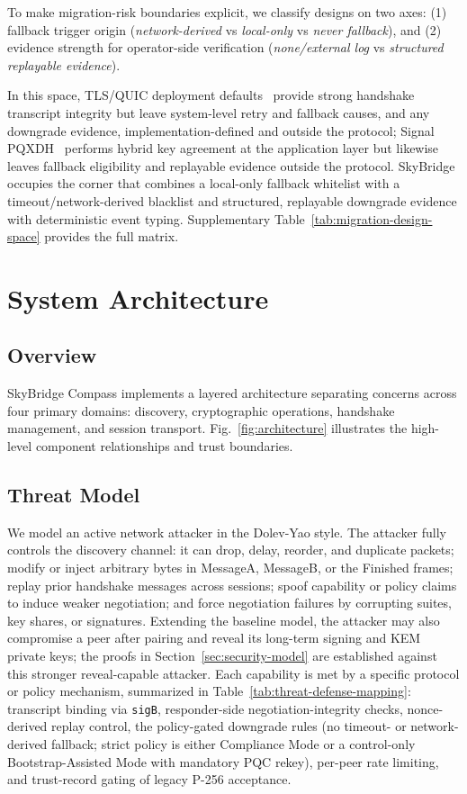 \documentclass[10pt,journal,compsoc]{IEEEtran}
\begin{document}
To make migration-risk boundaries explicit, we classify designs on two
axes: (1) fallback trigger origin (\emph{network-derived} vs
\emph{local-only} vs \emph{never fallback}), and (2) evidence strength
for operator-side verification (\emph{none/external log} vs
\emph{structured replayable evidence}).

In this space, TLS/QUIC deployment defaults~\cite{ref6,ref18} provide
strong handshake transcript integrity but leave system-level retry and
fallback causes, and any downgrade evidence, implementation-defined and
outside the protocol; Signal PQXDH~\cite{ref9} performs hybrid key
agreement at the application layer but likewise leaves fallback
eligibility and replayable evidence outside the protocol. SkyBridge
occupies the corner that combines a local-only fallback whitelist with a
timeout/network-derived blacklist and structured, replayable downgrade
evidence with deterministic event typing. Supplementary
Table~\ref{tab:migration-design-space} provides the full matrix.

\section{System Architecture}\label{sec:system-architecture}

\subsection{Overview}\label{a.-overview}

SkyBridge Compass implements a layered architecture separating concerns
across four primary domains: discovery, cryptographic operations,
handshake management, and session transport. Fig.~\ref{fig:architecture} illustrates the
high-level component relationships and trust boundaries.

\subsection{Threat Model}\label{a.1-threat-model}

We model an active network attacker in the Dolev-Yao style. The attacker
fully controls the discovery channel: it can drop, delay, reorder, and
duplicate packets; modify or inject arbitrary bytes in MessageA,
MessageB, or the Finished frames; replay prior handshake messages across
sessions; spoof capability or policy claims to induce weaker
negotiation; and force negotiation failures by corrupting suites, key
shares, or signatures. Extending the baseline model, the attacker may
also compromise a peer after pairing and reveal its long-term signing
and KEM private keys; the proofs in Section~\ref{sec:security-model} are
established against this stronger reveal-capable attacker. Each
capability is met by a specific protocol or policy mechanism, summarized
in Table~\ref{tab:threat-defense-mapping}: transcript binding via
\texttt{sigB}, responder-side negotiation-integrity checks,
nonce-derived replay control, the policy-gated downgrade rules (no
timeout- or network-derived fallback; strict policy is either Compliance
Mode or a control-only Bootstrap-Assisted Mode with mandatory PQC
rekey), per-peer rate limiting, and trust-record gating of legacy P-256
acceptance.
\end{document}
